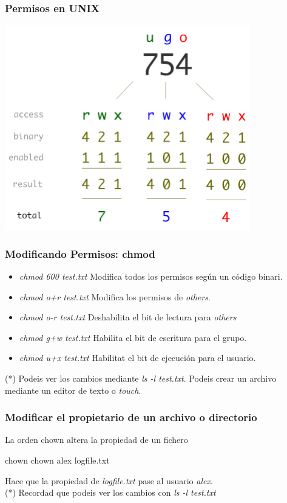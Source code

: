\documentclass[colorlinks,10pt]{beamer}
\begin{document}
\begin{frame}
  \frametitle{Permisos en UNIX}
    \begin{center}
    \includegraphics[width=0.8\textwidth]{figs/permissions1} 
  \end{center} 
\end{frame}




\begin{frame}
  \frametitle{Modificando Permisos: chmod}
  \begin{block}{}
    \begin{itemize}
    \item<+-> \emph{chmod 600 test.txt} Modifica todos los permisos
      según un  código binari.
    \item<+-> \emph{chmod o+r test.txt} Modifica los permisos de \emph{others}.
    \item<+->\emph{ chmod o-r test.txt} Deshabilita el bit de lectura
      para \emph{others}
    \item<+-> \emph{chmod g+w test.txt} Habilita el bit de escritura
      para el grupo.
    \item<+-> \emph{chmod u+x test.txt} Habilitat el bit de ejecución
      para el usuario.
    \end{itemize}
  \end{block}
(*) Podeis ver los cambios mediante \emph{ls -l test.txt}. Podeis crear un archivo mediante un editor de texto o \emph{touch}. 
\end{frame}


\begin{frame}
  \frametitle{Modificar el propietario de un archivo o directorio}
  
  La orden chown altera la propiedad de un fichero
  \begin{block}{chown}
    chown alex logfile.txt
  \end{block}
  Hace que la propiedad de \emph{ logfile.txt} pase al usuario  \emph{alex}.\\

(*) Recordad que podeis ver los cambios con \emph{ls -l test.txt}

\end{frame}
\end{document}
